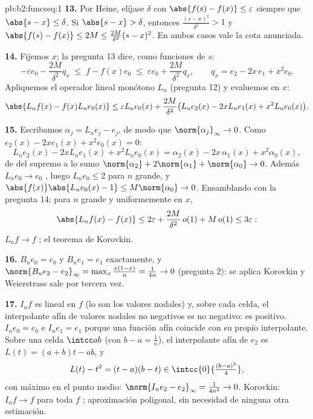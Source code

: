 \begin{solution}{pb:b2:funcseq:1}
\textbf{13.} Por Heine, elíjase $\delta$ con $\abs{f(s)-f(x)} \leq
\varepsilon$ siempre que $\abs{s-x} \leq \delta$. Si $\abs{s - x} >
\delta$, entonces $\frac{(s-x)^2}{\delta^2} > 1$ y $\abs{f(s)-f(x)}
\leq 2M \leq \frac{2M}{\delta^2}(s-x)^2$. En ambos casos vale la
cota anunciada.

\textbf{14.} Fijemos $x$; la pregunta 13 dice, como funciones de
$s$:
\[
-\varepsilon e_0 - \frac{2M}{\delta^2}q_x
\;\leq\; f - f(x)e_0
\;\leq\; \varepsilon e_0 + \frac{2M}{\delta^2}q_x,
\qquad q_x = e_2 - 2x\,e_1 + x^2e_0 .
\]
Apliquemos el operador lineal monótono $L_n$ (pregunta 12) y
evaluemos en $x$:
\[
\abs{L_nf(x) - f(x)L_ne_0(x)}
\leq \varepsilon L_ne_0(x)
+ \frac{2M}{\delta^2}\bigl(L_ne_2(x) - 2xL_ne_1(x)
+ x^2L_ne_0(x)\bigr) .
\]

\textbf{15.} Escribamos $\alpha_j = L_ne_j - e_j$, de modo que
$\norm{\alpha_j}_\infty \to 0$. Como $e_2(x) - 2xe_1(x) + x^2e_0(x)
= 0$:
\[
L_ne_2(x) - 2xL_ne_1(x) + x^2L_ne_0(x)
= \alpha_2(x) - 2x\,\alpha_1(x) + x^2\alpha_0(x),
\]
de  del supremo a lo sumo $\norm{\alpha_2} +
2\norm{\alpha_1} + \norm{\alpha_0} \to 0$. Además $L_ne_0 \to e_0$
, luego $L_ne_0 \leq 2$ para $n$ grande, y
$\abs{f(x)}\abs{L_ne_0(x) - 1} \leq M\norm{\alpha_0} \to 0$.
Ensamblando con la pregunta 14: para $n$ grande y uniformemente en
$x$,
\[
\abs{L_nf(x) - f(x)} \leq 2\varepsilon +
\frac{2M}{\delta^2}\,o(1) + M\,o(1) \leq 3\varepsilon :
\]
$L_nf \to f$ ; el teorema de Korovkin.

\textbf{16.} $B_ne_0 = e_0$ y $B_ne_1 = e_1$ exactamente, y
$\norm{B_ne_2 - e_2}_\infty = \max_x\frac{x(1-x)}{n} = \frac{1}{4n}
\to 0$ (pregunta 2): se aplica Korovkin y Weierstrass sale por
tercera vez.

\textbf{17.} $I_nf$ es lineal en $f$ (lo son los valores nodales) y,
sobre cada celda, el interpolante afín de valores nodales no
negativos es no negativo: es positivo. $I_ne_0 = e_0$ e $I_ne_1 =
e_1$ porque una función afín coincide con su propio interpolante.
Sobre una celda $\intcc ab$ (con $b - a = \frac1n$), el interpolante
afín de $e_2$ es $L(t) = (a+b)t - ab$, y
\[
L(t) - t^2 = (t-a)(b-t) \in
\intcc{0}{\tfrac{(b-a)^2}{4}} ,
\]
con máximo en el punto medio: $\norm{I_ne_2 - e_2}_\infty =
\frac{1}{4n^2} \to 0$. Korovkin: $I_nf \to f$  para
toda $f$ ; aproximación poligonal, sin necesidad de
ninguna otra estimación.


\end{solution}
